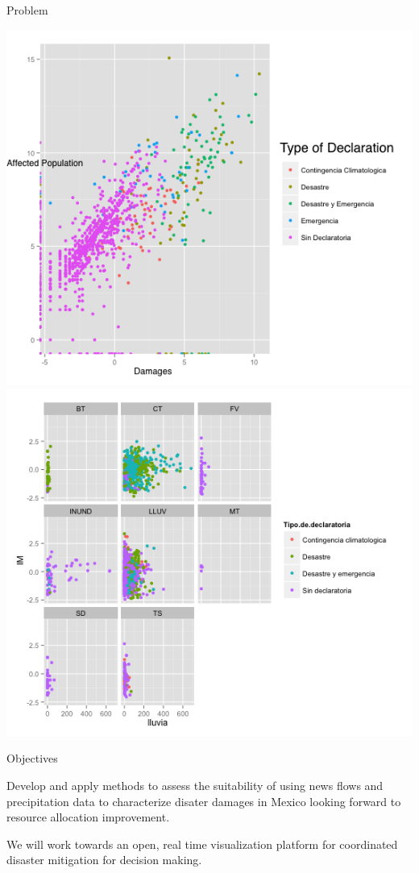\documentclass[ignorenonframetext,]{beamer}
\begin{document}
\begin{frame}{Problem}

\includegraphics{img/shady.png} \includegraphics{img/tipo_fen.png}

\end{frame}

\begin{frame}{Objectives}

Develop and apply methods to assess the suitability of using news flows
and precipitation data to characterize disater damages in Mexico looking
forward to resource allocation improvement.

We will work towards an open, real time visualization platform for
coordinated disaster mitigation for decision making.

\end{frame}
\end{document}
